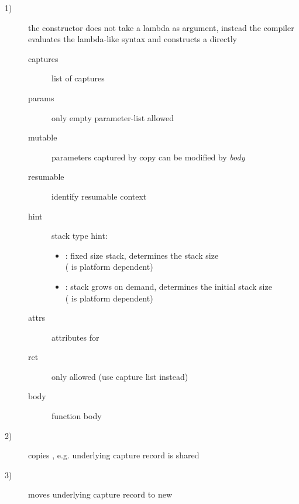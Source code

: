 \begin{description}
    \item[1)] the constructor does not take a lambda as argument, instead the
              compiler evaluates the lambda-like syntax and constructs a \ectx
              directly
              \begin{description}
                  \item[captures]     list of captures
                  \item[params]       only empty parameter-list allowed
                  \item[mutable]      parameters captured by copy can be modified by \emph{body}
                  \item[resumable]    identify resumable context
                  \item[hint]         stack type hint:
                                      \begin{itemize}
                                          \item {}:
                                              fixed size stack,  determines the stack size\\
                                              ( is platform dependent)
                                          \item {}:
                                              stack grows on demand,  determines the initial stack size\\
                                              ( is platform dependent)
                                      \end{itemize}
                  \item[attrs]        attributes for 
                  \item[ret]          only  allowed
                                      (use capture list instead)
                  \item[body]         function body\\
              \end{description}
    \item[2)] copies \ectx, e.g. underlying capture record is shared
    \item[3)] moves underlying capture record to new \ectx
\end{description}

